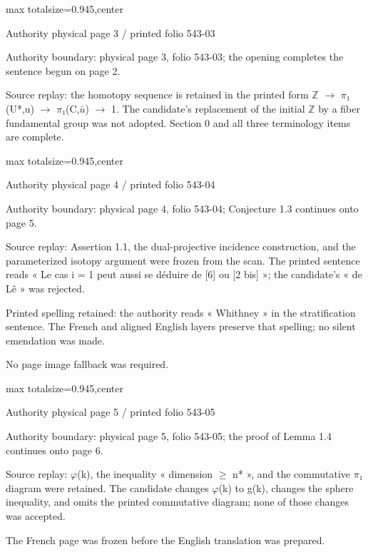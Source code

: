 \documentclass[10pt,a4paper]{article}
\begin{document}
\newpage
\noindent\begin{adjustbox}{max totalsize={\textwidth}{0.945\textheight},center}
\begin{minipage}{\textwidth}
\noindent\hfill\scriptsize Authority physical page 3 / printed folio 543-03\par\normalsize
\noindent Authority boundary: physical page 3, folio 543-03; the opening completes the sentence begun on page 2.\par\smallskip
\noindent Source replay: the homotopy sequence is retained in the printed form \ensuremath{ℤ} \ensuremath{→} \ensuremath{π₁}(U*,u) \ensuremath{→} \ensuremath{π₁}(C,\ensuremath{\bar{u}}) \ensuremath{→} 1. The candidate's replacement of the initial \ensuremath{ℤ} by a fiber fundamental group was not adopted. Section 0 and all three terminology items are complete.\par\smallskip
\end{minipage}
\end{adjustbox}
\newpage
\noindent\begin{adjustbox}{max totalsize={\textwidth}{0.945\textheight},center}
\begin{minipage}{\textwidth}
\noindent\hfill\scriptsize Authority physical page 4 / printed folio 543-04\par\normalsize
\noindent Authority boundary: physical page 4, folio 543-04; Conjecture 1.3 continues onto page 5.\par\smallskip
\noindent Source replay: Assertion 1.1, the dual-projective incidence construction, and the parameterized isotopy argument were frozen from the scan. The printed sentence reads « Le cas i = 1 peut aussi se déduire de [6] ou [2 bis] »; the candidate's « de Lê » was rejected.\par\smallskip
\noindent Printed spelling retained: the authority reads « Whithney » in the stratification sentence. The French and aligned English layers preserve that spelling; no silent emendation was made.\par\smallskip
\noindent No page image fallback was required.\par\smallskip
\end{minipage}
\end{adjustbox}
\newpage
\noindent\begin{adjustbox}{max totalsize={\textwidth}{0.945\textheight},center}
\begin{minipage}{\textwidth}
\noindent\hfill\scriptsize Authority physical page 5 / printed folio 543-05\par\normalsize
\noindent Authority boundary: physical page 5, folio 543-05; the proof of Lemma 1.4 continues onto page 6.\par\smallskip
\noindent Source replay: \ensuremath{φ}(k), the inequality « dimension \ensuremath{≥} n* », and the commutative \ensuremath{π₁} diagram were retained. The candidate changes \ensuremath{φ}(k) to g(k), changes the sphere inequality, and omits the printed commutative diagram; none of those changes was accepted.\par\smallskip
\noindent The French page was frozen before the English translation was prepared.\par\smallskip
\end{minipage}
\end{adjustbox}
\end{document}
